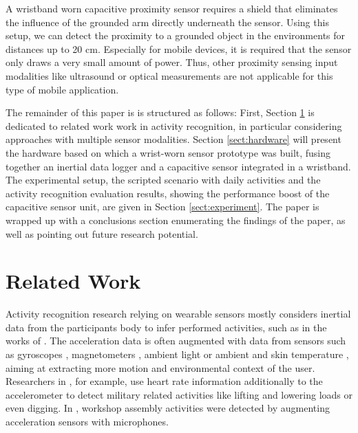 \documentclass[runningheads,a4paper]{llncs}
\begin{document}
A wristband worn capacitive proximity sensor requires a shield that eliminates the influence of the grounded arm directly underneath the sensor. Using this setup, we can detect the proximity to a grounded object in the environments for distances up to 20 cm. Especially for mobile devices, it is required that the sensor only draws a very small amount of power. Thus, other proximity sensing input modalities like ultrasound or optical measurements are not applicable for this type of mobile application.


The remainder of this paper is  is structured as follows: First, Section \ref{sect:related} is dedicated to related work work in activity recognition, in particular considering approaches with multiple sensor modalities. Section \ref{sect:hardware} will present the hardware based on which a wrist-worn sensor prototype was built, fusing together an inertial data logger and a capacitive sensor integrated in a wristband. The experimental setup, the scripted scenario with daily activities and the activity recognition evaluation results, showing the performance boost of the capacitive sensor unit, are given in Section \ref{sect:experiment}. The paper is wrapped up with a conclusions section enumerating the findings of the paper, as well as pointing out future research potential.




\section{Related Work}
\label{sect:related}

Activity recognition research relying on wearable sensors mostly considers inertial data from the participants body to infer performed activities, such as in the works of \cite{Ravi2005,Bao2004,Srinivasan2010,Amft2005}. The acceleration data is often augmented with data from sensors such as gyroscopes \cite{Holleczek_2010}, magnetometers \cite{Altun_2010}, ambient light \cite{Borazio2012} or ambient and skin temperature \cite{Krause_2003}, aiming at extracting more motion and environmental context of the user. Researchers in \cite{wyss2010recognition}, for example, use heart rate information additionally to the accelerometer to detect military related activities like lifting and lowering loads or even digging. In \cite{Ward_2006}, workshop assembly activities were detected by augmenting acceleration sensors with microphones.
\end{document}

